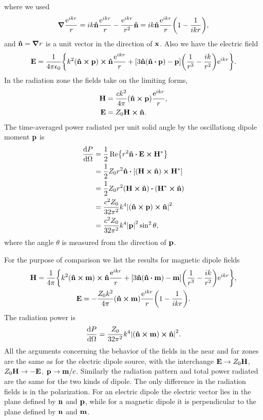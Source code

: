 \documentclass[10pt]{article}
\begin{document}
where we used
\begin{equation}
	\grad{\frac{{\mathrm{e}}^{ikr}}{r}} = ik \vu{n} \frac{{\mathrm{e}}^{ikr}}{r} - \frac{{\mathrm{e}}^{ikr}}{r^2} \vu{n} = ik \vu{n} \frac{{\mathrm{e}}^{ikr}}{r} \qty(1- \frac{1}{ikr}),
\end{equation}
and $\vu{n} = \grad{r}$ is a unit vector in the direction of $\vb{x}$. Also we have the electric field
\begin{equation}
	\vb{E} = \frac{1}{4\pi \epsilon_0} \qty{k^2 (\vu{n} \cross \vb{p}) \cross \vu{n} \frac{\e^{ikr}}{r} + [3 \vu{n} (\vu{n} \vdot \vb{p}) - \vb{p}] \qty(\frac{1}{r^3} - \frac{ik}{r^2}) \e^{ikr}}.
\end{equation}
In the radiation zone the fields take on the limiting forms,
\begin{align*}
	\vb{H} &= \frac{ck^2}{4\pi} (\vu{n} \cross \vb{p}) \frac{{\mathrm{e}}^{ikr}}{r}, \\
	\vb{E} &= Z_0 \vb{H} \cross \vu{n}.
\end{align*}
The time-averaged power radiated per unit solid angle by the oscillationg dipole moment $\vb{p}$ is
\begin{align*}
	\frac{\dd{P}}{\dd{\Omega}} &= \frac{1}{2} \Re{r^2 \vu{n} \vdot \vb{E} \cross \vb{H}^*} \\
	&= \frac{1}{2}Z_0 r^2 \vu{n} \vdot [(\vb{H} \cross \vu{n}) \cross \vb{H}^*] \\
	&= \frac{1}{2}Z_0 r^2 (\vb{H} \cross \vu{n}) \vdot (\vb{H}^* \cross \vu{n}) \\
	&= \frac{c^2 Z_0}{32 \pi^2} k^4 \abs{(\vu{n} \cross \vb{p}) \cross \vu{n}}^2 \\
	&= \frac{c^2 Z_0}{32 \pi^2} k^4 \abs{\vb{p}}^2 \sin^2{\theta},
\end{align*}
where the angle $\theta$ is measured from the direction of $\vb{p}$.

For the purpose of comparison we list the results for magnetic dipole fields
\begin{gather}
	\vb{H} = \frac{1}{4\pi} \qty{k^2 (\vu{n} \cross \vb{m}) \cross \vu{n} \frac{\e^{ikr}}{r} + [3 \vu{n} (\vu{n} \vdot \vb{m}) - \vb{m}] \qty(\frac{1}{r^3} - \frac{ik}{r^2}) \e^{ikr}}, \\
	\vb{E} = - \frac{Z_0 k^2}{4\pi} (\vu{n} \cross \vb{m}) \frac{\e^{ikr}}{r} \qty(1- \frac{1}{ikr}).
\end{gather}
The radiation power is
\begin{equation}
\frac{\dd{P}}{\dd{\Omega}} = \frac{Z_0}{32 \pi^2} k^4 \abs{(\vu{n} \cross \vb{m}) \cross \vu{n}}^2.
\end{equation}
All the arguments concerning the behavior of the fields in the near and far zones are the same as for the electric dipole source, with the interchange $\vb{E} \to Z_0 \vb{H}$, $Z_0 \vb{H} \to -\vb{E}$, $\vb{p} \to \vb{m}/c$. Similarly the radiation pattern and total power radiated are the same for the two kinds of dipole. The only difference in the radiation fields is in the polarization. For an electric dipole the electric vector lies in the plane defined by $\vb{n}$ and $\vb{p}$, while for a magnetic dipole it is perpendicular to the plane defined by $\vb{n}$ and $\vb{m}$.
\end{document}

